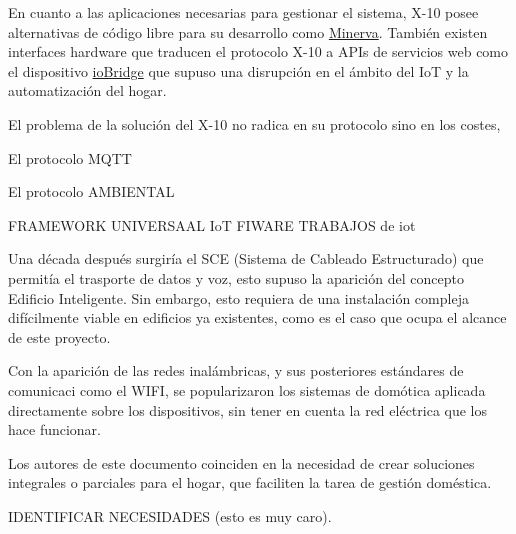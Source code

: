 En cuanto a las aplicaciones necesarias para gestionar el sistema, X-10 posee alternativas de código libre para su desarrollo como \href{http://www.minervahome.net/}{Minerva}. También existen interfaces hardware que traducen el protocolo X-10 a APIs de servicios web como el dispositivo \href{http://www.iobridge.com/}{ioBridge} que supuso una disrupción en el ámbito del IoT y la automatización del hogar.

El problema de la solución del X-10 no radica en su protocolo sino en los costes,

El protocolo MQTT

El protocolo AMBIENTAL

FRAMEWORK UNIVERSAAL IoT
FIWARE
TRABAJOS de iot


Una década después surgiría el SCE (Sistema de Cableado Estructurado) que permitía el trasporte de datos y voz, esto supuso la aparición del concepto Edificio Inteligente. Sin embargo, esto requiera de una instalación compleja difícilmente viable en edificios ya existentes, como es el caso que ocupa el alcance de este proyecto.

Con la aparición de las redes inalámbricas, y sus posteriores estándares de comunicaci como el WIFI, se popularizaron los sistemas de domótica aplicada directamente sobre los dispositivos, sin tener en cuenta la red eléctrica que los hace funcionar.

Los autores de este documento coinciden en la necesidad de crear soluciones integrales o parciales para el hogar, que faciliten la tarea de gestión doméstica.

IDENTIFICAR NECESIDADES (esto es muy caro).
